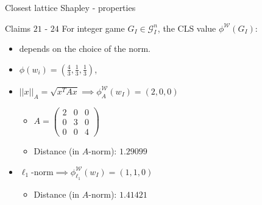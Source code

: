\documentclass{beamer}
\begin{document}
\begin{frame}{Closest lattice Shapley - properties}

    \begin{block}{Claims $21$ - $24$}
        For integer game $G_I \in \mathcal{G}_I^n$, the CLS value $\phi^\mathcal{W}(G_I)$:
        \begin{itemize}
            \item depends on the choice of the norm.
        \end{itemize}
    \end{block}

    \begin{itemize}
        \item $\phi(w_i) = (\frac{4}{3},\frac{1}{3},\frac{1}{3})$,
        \item $||x||_A=\sqrt{x^T A x}\implies \phi^\mathcal{W}_A(w_I) = (2,0,0)$
        \begin{itemize}
            \item $A = \begin{pmatrix}
            2 & 0 & 0 \\
            0 & 3 & 0 \\
            0 & 0 & 4
        \end{pmatrix}$
        \item Distance (in $A$-norm): $1.29099$
        \end{itemize}
        \item $\ell_1$-norm$\implies \phi^\mathcal{W}_{\ell_1}(w_I) = (1,1,0)$
        \begin{itemize}
            \item Distance (in $A$-norm): $1.41421$
        \end{itemize}
    \end{itemize}
\end{frame}


\end{document}
